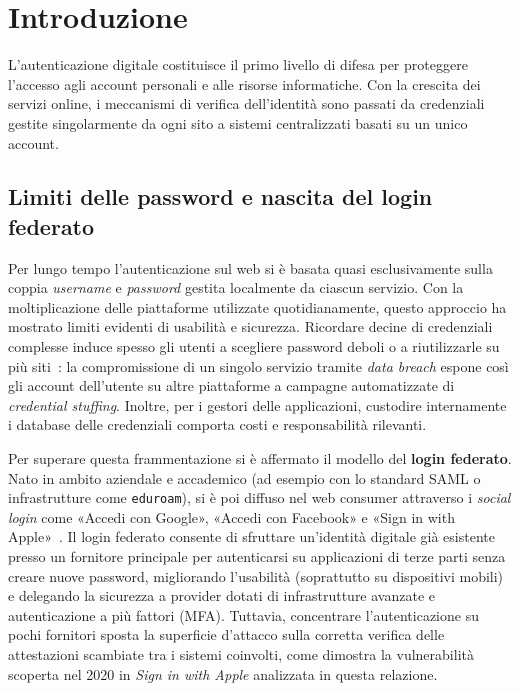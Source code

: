 \section{Introduzione}
\label{sec:introduzione}

L'autenticazione digitale costituisce il primo livello di difesa per proteggere l'accesso agli account personali e alle risorse informatiche. Con la crescita dei servizi online, i meccanismi di verifica dell'identità sono passati da credenziali gestite singolarmente da ogni sito a sistemi centralizzati basati su un unico account.

\subsection{Limiti delle password e nascita del login federato}
Per lungo tempo l'autenticazione sul web si è basata quasi esclusivamente sulla coppia \emph{username} e \emph{password} gestita localmente da ciascun servizio. Con la moltiplicazione delle piattaforme utilizzate quotidianamente, questo approccio ha mostrato limiti evidenti di usabilità e sicurezza. Ricordare decine di credenziali complesse induce spesso gli utenti a scegliere password deboli o a riutilizzarle su più siti~\cite{nist800-63b}: la compromissione di un singolo servizio tramite \emph{data breach} espone così gli account dell'utente su altre piattaforme a campagne automatizzate di \emph{credential stuffing}. Inoltre, per i gestori delle applicazioni, custodire internamente i database delle credenziali comporta costi e responsabilità rilevanti.

Per superare questa frammentazione si è affermato il modello del \textbf{login federato}. Nato in ambito aziendale e accademico (ad esempio con lo standard SAML o infrastrutture come \texttt{eduroam}), si è poi diffuso nel web consumer attraverso i \emph{social login} come «Accedi con Google», «Accedi con Facebook» e «Sign in with Apple»~\cite{nist800-63c}. Il login federato consente di sfruttare un'identità digitale già esistente presso un fornitore principale per autenticarsi su applicazioni di terze parti senza creare nuove password, migliorando l'usabilità (soprattutto su dispositivi mobili) e delegando la sicurezza a provider dotati di infrastrutture avanzate e autenticazione a più fattori (MFA). Tuttavia, concentrare l'autenticazione su pochi fornitori sposta la superficie d'attacco sulla corretta verifica delle attestazioni scambiate tra i sistemi coinvolti, come dimostra la vulnerabilità scoperta nel 2020 in \emph{Sign in with Apple} analizzata in questa relazione.